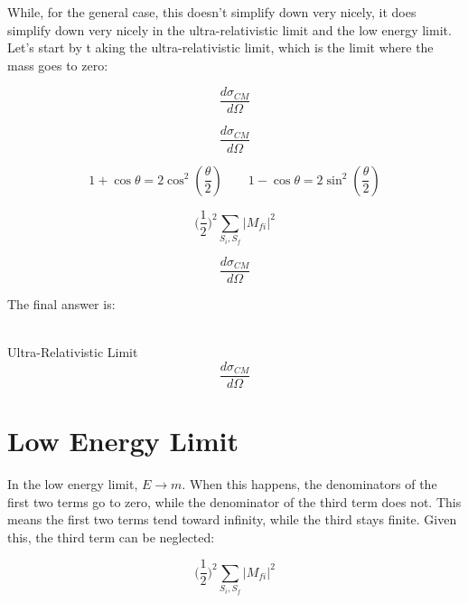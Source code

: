 \documentclass[a4]{article}
\begin{document}
    While, for the general case, this doesn't simplify down very nicely, it does simplify down very nicely in the ultra-relativistic limit and the low energy limit. Let's start by t aking the ultra-relativistic limit, 
    which is the limit where the mass goes to zero:
    
    \begin{equation}
        \frac{d \sigma_{CM}}{d \Omega}
    \end{equation}

    \begin{equation}
        \frac{d \sigma_{CM}}{d \Omega}
    \end{equation}

    \begin{equation}
        1 + \cos \theta = 2 \cos^2 (\frac{\theta}{2}) \qquad 1 - \cos \theta = 2 \sin^2 (\frac{\theta}{2})
    \end{equation}

    \begin{equation}
        \Big( \frac{1}{2} \Big)^2 \sum_{S_i, S_f} |M_{f i}|^2
    \end{equation}

    \begin{equation}
        \frac{d \sigma_{CM}}{d \Omega}
    \end{equation}

    The final answer is:

    \begin{framed}
         \\
        Ultra-Relativistic Limit
        \begin{equation}
            \frac{d \sigma_{CM}}{d \Omega}
        \end{equation}
    \end{framed}

    \section*{Low Energy Limit}

    In the low energy limit, $E \rightarrow m$. When this happens, the denominators of the first two terms go to zero, while the denominator of the third term
    does not. This means the first two terms tend toward infinity, while the third stays finite. Given this, the third term can be neglected:

    \begin{equation}
        \Big( \frac{1}{2} \Big)^2 \sum_{S_i, S_f} |M_{f i}|^2
    \end{equation}
\end{document}
